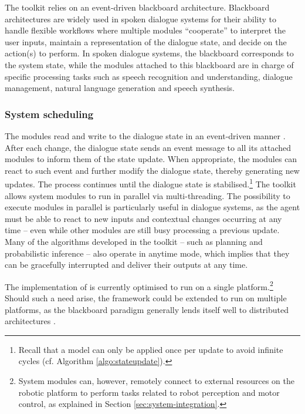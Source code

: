 The \opendial{} toolkit relies on an event-driven blackboard architecture. Blackboard architectures are widely used in spoken dialogue systems for their ability to handle flexible workflows where multiple modules ``cooperate'' to  interpret the user inputs, maintain a representation of the dialogue state, and decide on the action(s) to perform. In spoken dialogue systems, the blackboard corresponds to the system state, while the modules attached to this blackboard are in charge of specific processing tasks such as speech recognition and understanding, dialogue management, natural language generation and speech synthesis. 


\subsubsection*{System scheduling}

The modules read and write to the dialogue state in an event-driven manner . After each change, the dialogue state sends an event message to all its attached modules to inform them of the state update. When appropriate, the modules can react to such event and further modify the dialogue state, thereby generating new updates. The process continues until the dialogue state is stabilised.\footnote{Recall that a model can only be applied once per update to avoid infinite cycles (cf. Algorithm \ref{algo:stateupdate}).}   The \opendial{} toolkit allows system modules to run in parallel via multi-threading. The possibility to execute modules in parallel is particularly useful in dialogue systems, as the agent must be able to react to new inputs and contextual changes occurring at any time -- even while other modules are still busy processing a previous update.  Many of the algorithms developed in the toolkit -- such as planning and probabilistic inference -- also operate in anytime mode, which implies that they can be gracefully interrupted and deliver their outputs at any time.

The implementation of \opendial{} is currently optimised to run on a single platform.\footnote{System modules can, however, remotely connect to external resources on the robotic platform to perform tasks related to robot perception and motor control, as explained in Section \ref{sec:system-integration}.} Should such a need arise, the framework could be extended to run on multiple platforms, as the blackboard paradigm generally lends itself well to distributed architectures \citep{Corkill:1989}.

